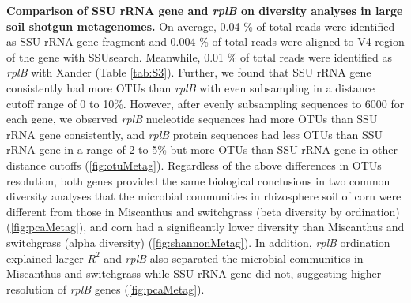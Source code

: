 \documentclass[]{msu-thesis}
\begin{document}
\textbf{Comparison of SSU rRNA gene and \textit{rplB} on diversity analyses in large soil shotgun metagenomes. }
On average, 0.04 \% of total reads were identified as SSU rRNA gene fragment and 0.004 \% of total reads were aligned to V4 region of the gene with SSUsearch. Meanwhile, 0.01 \% of total reads were identified as \textit{rplB} with Xander (Table \ref{tab:S3}). Further, we found that SSU rRNA gene consistently had more OTUs than \textit{rplB} with even subsampling in a distance cutoff range of 0 to 10\%. However, after evenly subsampling sequences to 6000 for each gene, we observed \textit{rplB} nucleotide sequences had more OTUs than SSU rRNA gene consistently, and \textit{rplB} protein sequences had less OTUs than SSU rRNA gene in a range of 2 to 5\% but more OTUs than SSU rRNA gene in other distance cutoffs (\cref{fig:otuMetag}). Regardless of the above differences in OTUs resolution, both genes provided the same biological conclusions in two common diversity analyses that the microbial communities in rhizosphere soil of corn were different from those in Miscanthus and switchgrass (beta diversity by ordination) (\cref{fig:pcaMetag}), and corn had a significantly lower diversity than Miscanthus and switchgrass (alpha diversity) (\cref{fig:shannonMetag}). In addition, \textit{rplB} ordination explained larger $R^2$ and \textit{rplB} also separated the microbial communities in Miscanthus and switchgrass while SSU rRNA gene did not, suggesting higher resolution of \textit{rplB} genes (\cref{fig:pcaMetag}).
\end{document}
